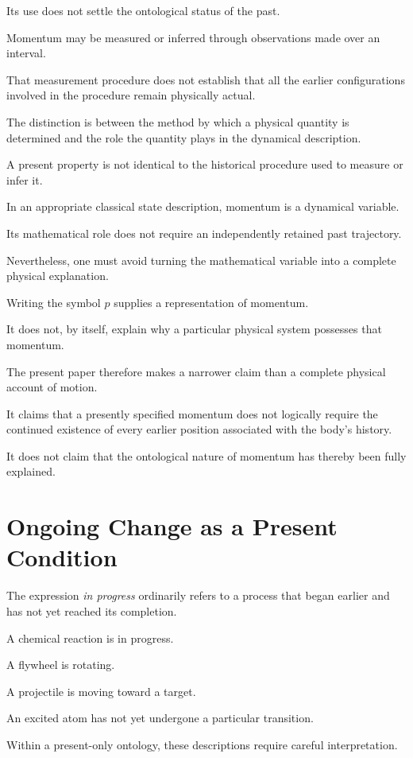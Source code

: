 \documentclass[12pt,onecolumn]{article}
\begin{document}
Its use does not settle the ontological status of the past.

Momentum may be measured or inferred through observations made over an interval.

That measurement procedure does not establish that all the earlier configurations involved in the procedure remain physically actual.

The distinction is between the method by which a physical quantity is determined and the role the quantity plays in the dynamical description.

A present property is not identical to the historical procedure used to measure or infer it.

In an appropriate classical state description, momentum is a dynamical variable.

Its mathematical role does not require an independently retained past trajectory.

Nevertheless, one must avoid turning the mathematical variable into a complete physical explanation.

Writing the symbol $p$ supplies a representation of momentum.

It does not, by itself, explain why a particular physical system possesses that momentum.

The present paper therefore makes a narrower claim than a complete physical account of motion.

It claims that a presently specified momentum does not logically require the continued existence of every earlier position associated with the body's history.

It does not claim that the ontological nature of momentum has thereby been fully explained.


\section{Ongoing Change as a Present Condition}

The expression \emph{in progress} ordinarily refers to a process that began earlier and has not yet reached its completion.

A chemical reaction is in progress.

A flywheel is rotating.

A projectile is moving toward a target.

An excited atom has not yet undergone a particular transition.

Within a present-only ontology, these descriptions require careful interpretation.
\end{document}
